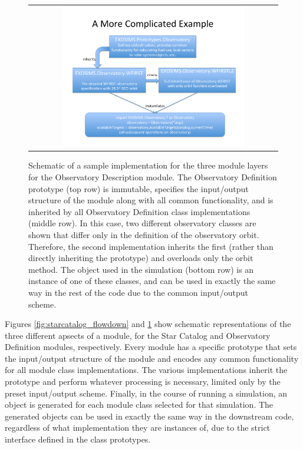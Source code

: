 \documentclass[cleanfoot]{asme2ej}
\begin{document}
\begin{figure}[ht]
    \begin{center}
        \begin{tabular}{c}
             \includegraphics[width=0.75\textwidth]{observatory_flowdown}
        \end{tabular}
    \end{center}
    \caption{Schematic of a sample implementation for the three module layers for the Observatory Description module. The Observatory Definition prototype (top row) is immutable, specifies the input/output structure of the module along with all common functionality, and is inherited by all Observatory Definition class implementations (middle row).  In this case, two different observatory classes are shown that differ only in the definition of the observatory orbit.  Therefore, the second implementation inherits the first (rather than directly inheriting the prototype) and overloads only the orbit method. The object used in the simulation (bottom row) is an instance of one of these classes, and can be used in exactly the same way in the rest of the code due to the common input/output scheme.}
    \label{fig:observatory_flowdown}
\end{figure}

Figures \ref{fig:starcatalog_flowdown} and \ref{fig:observatory_flowdown} show schematic representations of the three different apsects of a module, for the Star Catalog and Observatory Definition modules, respectively.  Every module has a specific prototype that sets the input/output structure of the module and encodes any common functionality for all module class implementations.  The various implementations inherit the prototype and perform whatever processing is necessary, limited only by the preset input/output scheme.  Finally, in the course of running a simulation, an object is generated for each module class selected for that simulation.  The generated objects can be used in exactly the same way in the downstream code, regardless of what implementation they are instances of, due to the strict interface defined in the class prototypes.
\end{document}
